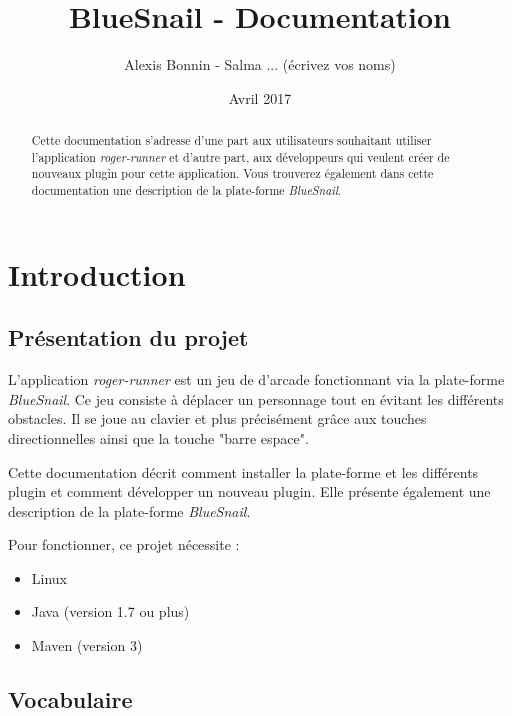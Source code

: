 \documentclass[11pt]{article}
\title{BlueSnail - Documentation}
\author{Alexis Bonnin - Salma ... (écrivez vos noms)}
\date{Avril 2017}
\begin{document}
\maketitle

\begin{abstract}
    Cette documentation s'adresse d'une part aux utilisateurs souhaitant utiliser l'application \textit{roger-runner} et d'autre part, aux développeurs qui veulent créer de nouveaux plugin pour cette application. Vous trouverez également dans cette documentation une description de la plate-forme \textit{BlueSnail}.
\end{abstract}

\tableofcontents

\newpage

\section{Introduction}

\subsection{Présentation du projet}
    L'application \textit{roger-runner} est un jeu de d'arcade fonctionnant via la plate-forme \textit{BlueSnail}. Ce jeu consiste à déplacer un personnage tout en évitant les différents obstacles. Il se joue au clavier et plus précisément grâce aux touches directionnelles ainsi que la touche "barre espace".
    
    Cette documentation décrit comment installer la plate-forme et les différents plugin et comment développer un nouveau plugin. Elle présente également une description de la plate-forme \textit{BlueSnail}.
    
    Pour fonctionner, ce projet nécessite :
    \begin{itemize}
        \item Linux
        \item Java (version 1.7 ou plus)
        \item Maven (version 3)
    \end{itemize}
    
\subsection{Vocabulaire}
\label{subsec:vocabulaire}
\end{document}
